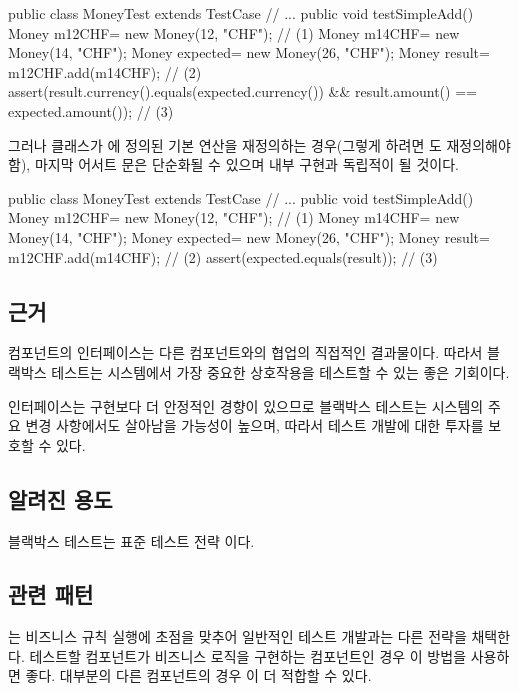\documentclass[a4paper,10pt,twoside]{book}
\begin{document}
\begin{code}
public class MoneyTest extends TestCase {
	// ...
		public void testSimpleAdd() {
			Money m12CHF= new Money(12, "CHF");                 // (1)
			Money m14CHF= new Money(14, "CHF");        
			Money expected= new Money(26, "CHF");
			Money result= m12CHF.add(m14CHF);                      // (2)
			assert(result.currency().equals(expected.currency())
				&& result.amount() == expected.amount());            // (3)
		}
}
\end{code}

그러나  클래스가 에 정의된 기본  연산을 재정의하는 경우(그렇게 하려면 도 재정의해야 함), 마지막 어서트 문은 단순화될 수 있으며 내부 구현과 독립적이 될 것이다.

\begin{code}
public class MoneyTest extends TestCase {
	// ...
		public void testSimpleAdd() {
			Money m12CHF= new Money(12, "CHF");            // (1)
			Money m14CHF= new Money(14, "CHF");        
			Money expected= new Money(26, "CHF");
			Money result= m12CHF.add(m14CHF);                // (2)
			assert(expected.equals(result));                            // (3)
		}
}
\end{code}

\subsection*{근거}

컴포넌트의 인터페이스는 다른 컴포넌트와의 협업의 직접적인 결과물이다. 따라서 블랙박스 테스트는 시스템에서 가장 중요한 상호작용을 테스트할 수 있는 좋은 기회이다.

인터페이스는 구현보다 더 안정적인 경향이 있으므로 블랙박스 테스트는 시스템의 주요 변경 사항에서도 살아남을 가능성이 높으며, 따라서 테스트 개발에 대한 투자를 보호할 수 있다.

\subsection*{알려진 용도}

블랙박스 테스트는 표준 테스트 전략 \cite{Somm96a}이다.

\subsection*{관련 패턴}

는 비즈니스 규칙 실행에 초점을 맞추어 일반적인 테스트 개발과는 다른 전략을 채택한다. 테스트할 컴포넌트가 비즈니스 로직을 구현하는 컴포넌트인 경우 이 방법을 사용하면 좋다. 대부분의 다른 컴포넌트의 경우 이 더 적합할 수 있다.
\end{document}
